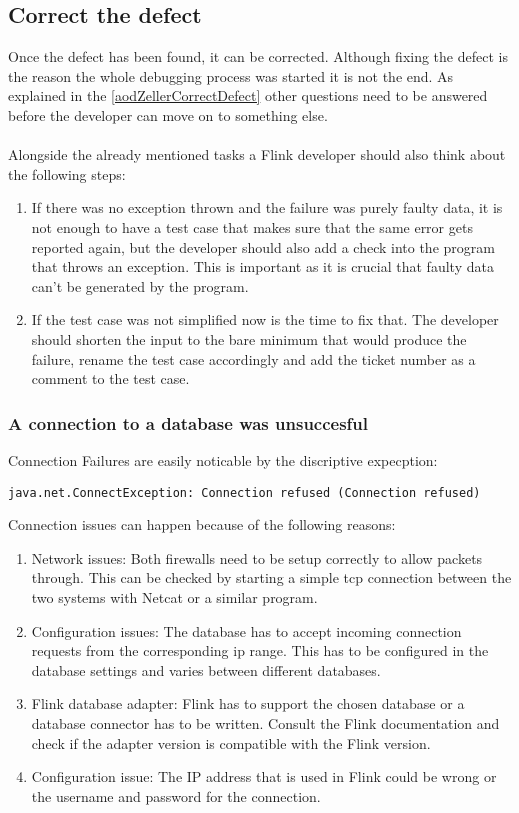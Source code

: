 \subsection{Correct the defect}
Once the defect has been found, it can be corrected. Although fixing the defect is the reason the whole debugging process was started it is not the end. As explained in the \ref{aodZellerCorrectDefect} other questions need to be answered before the developer can move on to something else.

\paragraph{} Alongside the already mentioned tasks a Flink developer should also think about the following steps:
\begin{enumerate}
  \item If there was no exception thrown and the failure was purely faulty data, it is not enough to have a test case that makes sure that the same error gets reported again, but the developer should also add a check into the program that throws an exception. This is important as it is crucial that faulty data can't be generated by the program.
  \item If the test case was not simplified now is the time to fix that. The developer should shorten the input to the bare minimum that would produce the failure, rename the test case accordingly and add the ticket number as a comment to the test case.
\end{enumerate}

\subsubsection{A connection to a database was unsuccesful}
Connection Failures are easily noticable by the discriptive expecption:
\begin{lstlisting}
java.net.ConnectException: Connection refused (Connection refused)
\end{lstlisting}
Connection issues can happen because of the following reasons:
\begin{enumerate}
\item Network issues: Both firewalls need to be setup correctly to allow packets through. This can be checked by starting a simple tcp connection between the two systems with Netcat or a similar program.
\item Configuration issues: The database has to accept incoming connection requests from the corresponding ip range. This has to be configured in the database settings and varies between different databases.
\item Flink database adapter: Flink has to support the chosen database or a database connector has to be written. Consult the Flink documentation and check if the adapter version is compatible with the Flink version.
\item Configuration issue: The IP address that is used in Flink could be wrong or the username and password for the connection.
\end{enumerate}
